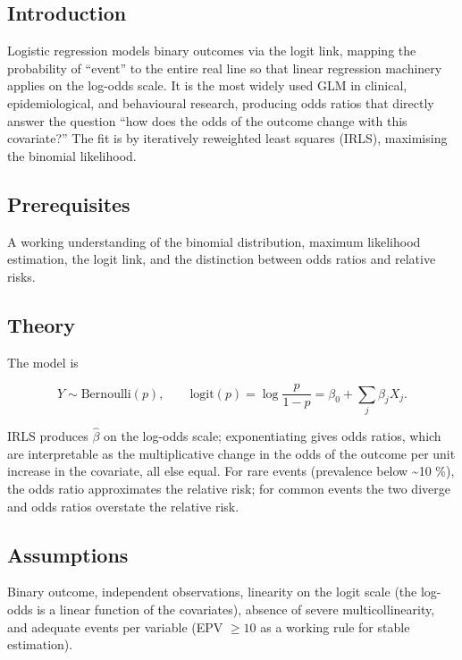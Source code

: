 \documentclass[
]{article}
\author{}
\date{\vspace{-2.5em}}
\begin{document}
\subsection{Introduction}\label{introduction}

Logistic regression models binary outcomes via the logit link, mapping
the probability of ``event'' to the entire real line so that linear
regression machinery applies on the log-odds scale. It is the most
widely used GLM in clinical, epidemiological, and behavioural research,
producing odds ratios that directly answer the question ``how does the
odds of the outcome change with this covariate?'' The fit is by
iteratively reweighted least squares (IRLS), maximising the binomial
likelihood.

\subsection{Prerequisites}\label{prerequisites}

A working understanding of the binomial distribution, maximum likelihood
estimation, the logit link, and the distinction between odds ratios and
relative risks.

\subsection{Theory}\label{theory}

The model is

\[Y \sim \mathrm{Bernoulli}(p), \qquad \mathrm{logit}(p) = \log\frac{p}{1-p} = \beta_0 + \sum_j \beta_j X_j.\]

IRLS produces \(\hat\beta\) on the log-odds scale; exponentiating gives
odds ratios, which are interpretable as the multiplicative change in the
odds of the outcome per unit increase in the covariate, all else equal.
For rare events (prevalence below \textasciitilde10 \%), the odds ratio
approximates the relative risk; for common events the two diverge and
odds ratios overstate the relative risk.

\subsection{Assumptions}\label{assumptions}

Binary outcome, independent observations, linearity on the logit scale
(the log-odds is a linear function of the covariates), absence of severe
multicollinearity, and adequate events per variable (EPV \(\ge 10\) as a
working rule for stable estimation).
\end{document}
